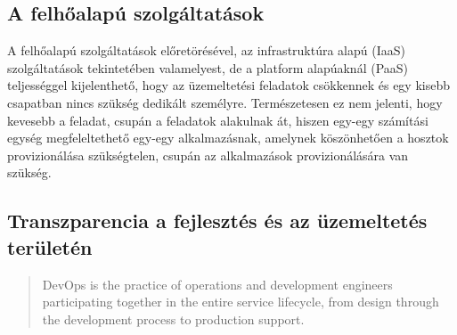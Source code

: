 \subsection*{A felhőalapú szolgáltatások}
A felhőalapú szolgáltatások előretörésével, az infrastruktúra alapú (IaaS) szolgáltatások tekintetében valamelyest, de a platform alapúaknál (PaaS) teljességgel kijelenthető, hogy az üzemeltetési feladatok csökkennek és egy kisebb csapatban nincs szükség dedikált személyre. Természetesen ez nem jelenti, hogy kevesebb a feladat, csupán a feladatok alakulnak át, hiszen egy-egy számítási egység megfeleltethető egy-egy alkalmazásnak, amelynek köszönhetően a hosztok provizionálása szükségtelen, csupán az alkalmazások provizionálására van szükség.

\subsection*{Transzparencia a fejlesztés és az üzemeltetés területén}
\begin{quote}
DevOps is the practice of operations and development engineers participating together in the entire service lifecycle, from design through the development process to production support.
\end{quote}
\begin{flushright}
\citet*{agile_admin}
\end{flushright}

